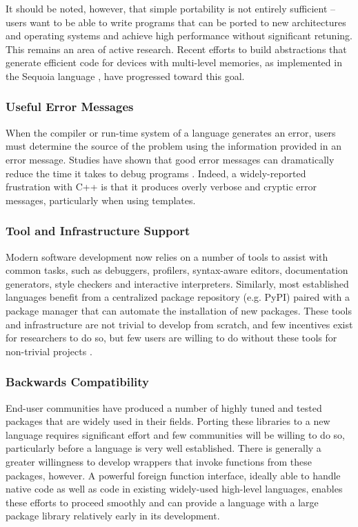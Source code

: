 \documentclass{llncs}
\begin{document}
It should be noted, however, that simple portability is not entirely sufficient -- users want to be able to write programs that can be ported to new architectures and operating systems and achieve high performance without significant retuning. This remains an area of active research. Recent efforts to build abstractions that generate efficient code for devices with multi-level memories, as implemented in the Sequoia language \cite{fatahalian2006sequoia}, have  progressed toward this goal.

\subsubsection{Useful Error Messages}\label{errors}
When the compiler or run-time system of a language generates an error, users must determine the source of the problem using the information provided in an error message. Studies have shown that good error messages can dramatically reduce the time it takes to debug programs \cite{marceau2011measuring}. Indeed, a widely-reported frustration with C++ is that it produces overly verbose and cryptic error messages, particularly when using templates.

\subsubsection{Tool and Infrastructure Support}\label{tools}
Modern software development now relies on a number of tools to assist with common tasks, such as debuggers,  profilers, syntax-aware editors, documentation generators, style checkers and interactive interpreters. Similarly, most established languages benefit from a centralized package repository (e.g. PyPI) paired with a package manager that can automate the installation of new packages. These tools and infrastructure are not trivial to develop from scratch, and few incentives exist for researchers to do so, but few users are willing to do without these tools for non-trivial projects \cite{squires2005programmers}.

\subsubsection{Backwards Compatibility}
End-user communities have produced a number of highly tuned and tested packages that are widely used in their fields. Porting these libraries to a new language requires significant effort and few communities will be willing to do so, particularly before a language is very well established. There is generally a greater willingness to develop wrappers that invoke functions from these packages, however. A powerful foreign function interface, ideally able to handle native code as well as code in existing widely-used high-level languages, enables these efforts to proceed smoothly and can provide a language with a large package library relatively early in its development. 
\end{document}
